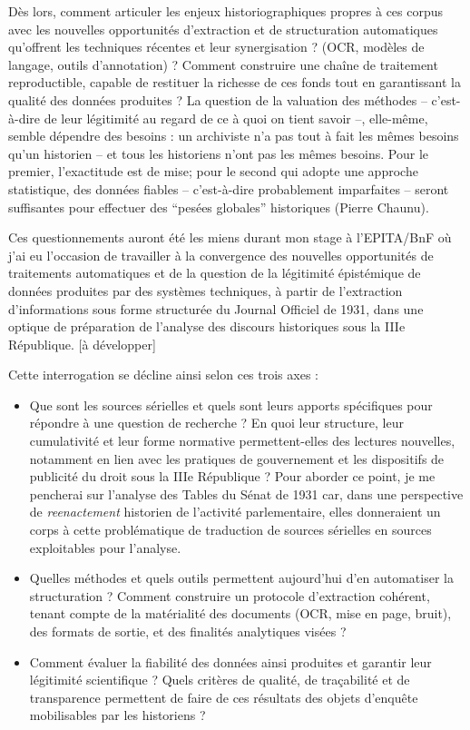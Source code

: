 Dès lors, comment articuler les enjeux historiographiques propres à ces corpus avec les nouvelles opportunités d’extraction et de structuration automatiques qu’offrent les techniques récentes et leur synergisation ? (OCR, modèles de langage, outils d’annotation) ? Comment construire une chaîne de traitement reproductible, capable de restituer la richesse de ces fonds tout en garantissant la qualité des données produites ? La question de la valuation des méthodes -- c'est-à-dire de leur légitimité au regard de ce à quoi on tient savoir --, elle-même, semble dépendre des besoins : un archiviste n'a pas tout à fait les mêmes besoins qu'un historien -- et tous les historiens n'ont pas les mêmes besoins. Pour le premier, l'exactitude est de mise; pour le second qui adopte une approche statistique, des données fiables -- c'est-à-dire probablement imparfaites -- seront suffisantes pour effectuer des \enquote{pesées globales} historiques (Pierre Chaunu).


Ces questionnements auront été les miens durant mon stage à l'EPITA/BnF où j'ai eu l'occasion de travailler à la convergence des nouvelles opportunités de traitements automatiques et de la question de la légitimité épistémique de données produites par des systèmes techniques, à partir de l'extraction d'informations sous forme structurée du Journal Officiel de 1931, dans une optique de préparation de l'analyse des discours historiques sous la IIIe République. [à développer] 

Cette interrogation se décline ainsi selon ces trois axes :

\begin{itemize}
	\item Que sont les sources sérielles et quels sont leurs apports spécifiques pour répondre à une question de recherche ? En quoi leur structure, leur cumulativité et leur forme normative permettent-elles des lectures nouvelles, notamment en lien avec les pratiques de gouvernement et les dispositifs de publicité du droit sous la IIIe République ? Pour aborder ce point, je me pencherai sur l'analyse des Tables du Sénat de 1931 car, dans une perspective de \textit{reenactement} historien de l'activité parlementaire, elles donneraient un corps à cette problématique de traduction de sources sérielles en sources exploitables pour l'analyse.
	\item Quelles méthodes et quels outils permettent aujourd’hui d’en automatiser la structuration ? Comment construire un protocole d’extraction cohérent, tenant compte de la matérialité des documents (OCR, mise en page, bruit), des formats de sortie, et des finalités analytiques visées ?
	\item Comment évaluer la fiabilité des données ainsi produites et garantir leur légitimité scientifique ? Quels critères de qualité, de traçabilité et de transparence permettent de faire de ces résultats des objets d’enquête mobilisables par les historiens ?
\end{itemize}

